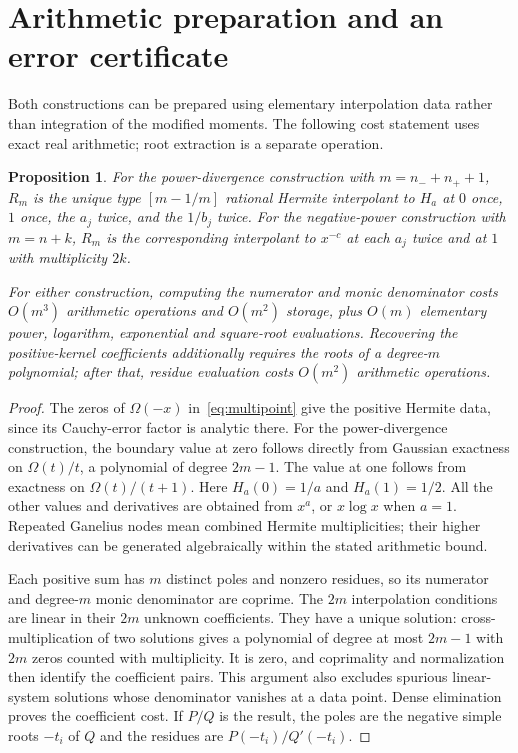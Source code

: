 \documentclass[11pt]{article}
\newtheorem{proposition}[theorem]{Proposition}
\numberwithin{equation}{section}
\begin{document}
\section{Arithmetic preparation and an error certificate}

Both constructions can be prepared using elementary interpolation
data rather than integration of the modified moments. The following
cost statement uses exact real arithmetic; root extraction is a
separate operation.

\begin{proposition}\label{prop:preparation}
For the power-divergence construction with $m=n_-+n_++1$, $R_m$ is
the unique type $[m-1/m]$ rational Hermite interpolant to $H_a$ at
$0$ once, $1$ once, the $a_j$ twice, and the $1/b_j$ twice.
For the negative-power construction with $m=n+k$, $R_m$ is the
corresponding interpolant to $x^{-c}$ at each $a_j$ twice and at $1$
with multiplicity $2k$.

For either construction, computing the numerator and monic denominator
costs $O(m^3)$ arithmetic operations and $O(m^2)$ storage, plus
$O(m)$ elementary power, logarithm, exponential and square-root
evaluations. Recovering the positive-kernel coefficients additionally
requires the roots of a degree-$m$ polynomial; after that, residue
evaluation costs $O(m^2)$ arithmetic operations.
\end{proposition}

\begin{proof}
The zeros of $\Omega(-x)$ in~\eqref{eq:multipoint} give the positive
Hermite data, since its Cauchy-error factor is analytic there.
For the power-divergence construction, the boundary value at zero
follows directly from Gaussian exactness on $\Omega(t)/t$, a polynomial
of degree $2m-1$. The value at one follows from exactness on
$\Omega(t)/(t+1)$. Here $H_a(0)=1/a$ and $H_a(1)=1/2$.
All the other values and derivatives are obtained from $x^a$, or
$x\log x$ when $a=1$. Repeated Ganelius nodes mean combined Hermite
multiplicities; their higher derivatives can be generated algebraically
within the stated arithmetic bound.

Each positive sum has $m$ distinct poles and nonzero residues, so its
numerator and degree-$m$ monic denominator are coprime. The $2m$
interpolation conditions are linear in their $2m$ unknown coefficients.
They have a unique solution: cross-multiplication of two solutions
gives a polynomial of degree at most $2m-1$ with $2m$ zeros counted
with multiplicity. It is zero, and coprimality and normalization then
identify the coefficient pairs. This argument also excludes spurious
linear-system solutions whose denominator vanishes at a data point.
Dense elimination proves the coefficient cost. If $P/Q$ is the result,
the poles are the negative simple roots $-t_i$ of $Q$ and the residues
are $P(-t_i)/Q'(-t_i)$.
\end{proof}
\end{document}
